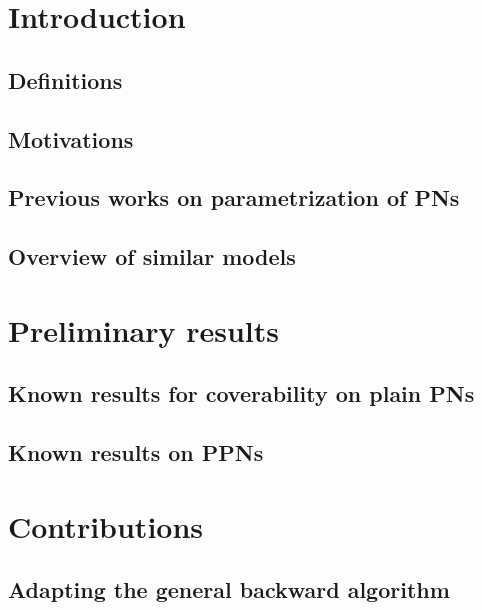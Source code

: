 \documentclass[11pt,a4paper,oneside]{book}
\theoremstyle{plain}
\theoremstyle{definition}
\theoremstyle{remark}
\begin{document}
\thispagestyle{empty} 
\setcounter{page}{0}
\tableofcontents
\acresetall

\mainmatter
\setcounter{page}{1}

\chapter{Introduction}

\section{Definitions}

\section{Motivations}


\section{Previous works on parametrization of \acp{PN}}

\section{Overview of similar models}


\chapter{Preliminary results}

\section{Known results for coverability on plain \acp{PN}}

\section{Known results on \acp{PPN}}


\chapter{Contributions}

\section{Adapting the general backward algorithm}

\end{document}
